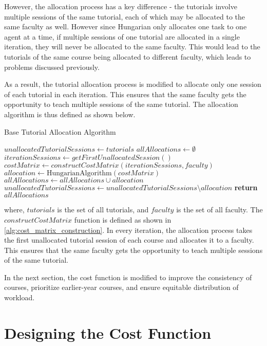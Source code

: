 However, the allocation process has a key difference - the tutorials involve multiple sessions of the same tutorial, each of which may be allocated to the same faculty as well. However since Hungarian only allocates one task to one agent at a time, if multiple sessions of one tutorial are allocated in a single iteration, they will never be allocated to the same faculty. This would lead to the tutorials of the same course being allocated to different faculty, which leads to problems discussed previously.

As a result, the tutorial allocation process is modified to allocate only one session of each tutorial in each iteration. This ensures that the same faculty gets the opportunity to teach multiple sessions of the same tutorial. The allocation algorithm is thus defined as shown below.

\begin{algorithm}[H]
  \caption*{Base Tutorial Allocation Algorithm}
  \begin{algorithmic}
    \State $unallocatedTutorialSessions \gets tutorials$
    \State $allAllocations \gets \emptyset$
    \State $iterationSessions \gets getFirstUnallocatedSession()$
    \State $costMatrix \gets constructCostMatrix(iterationSessions, faculty)$
    \State $allocation \gets \text{HungarianAlgorithm}(costMatrix)$
    \State $allAllocations \gets allAllocations \cup allocation$
    \State $unallocatedTutorialSessions \gets unallocatedTutorialSessions \setminus allocation$
    \EndWhile
    \State \textbf{return} $allAllocations$
    \EndProcedure
  \end{algorithmic}
\end{algorithm}

where, $tutorials$ is the set of all tutorials, and $faculty$ is the set of all faculty. The $constructCostMatrix$ function is defined as shown in \autoref{alg:cost_matrix_construction}. In every iteration, the allocation process takes the first unallocated tutorial session of each course and allocates it to a faculty. This ensures that the same faculty gets the opportunity to teach multiple sessions of the same tutorial.

In the next section, the cost function is modified to improve the consistency of courses, prioritize earlier-year courses, and ensure equitable distribution of workload.

\section{Designing the Cost Function}

